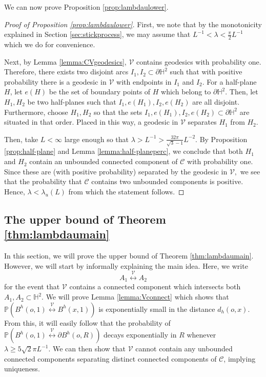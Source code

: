 \documentclass[a4paper,12pt]{article}
\newcommand{\BH}{{\mathbb{H}}}
\newcommand{\BP}{{\mathbb{P}}}
\newcommand{\CC}{{\mathcal{C}}}
\newcommand{\CV}{{\mathcal{V}}}
\begin{document}
We can now prove Proposition \ref{prop:lambdaulower}.
\begin{proof}[Proof of Proposition \ref{prop:lambdaulower}]
First, we note that by the monotonicity explained in Section \ref{sec:stickprocess},
we may assume that $L^{-1}< \lambda<\frac{\pi}{2}L^{-1}$ which we do for convenience.

Next, by Lemma \ref{lemma:CVgeodesics}, $\CV$ contains geodesics with probability one. Therefore, 
there exists two disjoint arcs $I_1,I_2\subset \partial \BH^2$ such that 
with positive probability there is a geodesic in $\CV$ with endpoints in $I_1$ 
and $I_2.$ For a half-plane $H$, let $e(H)$ be the set of boundary points of $H$ which 
belong to $\partial \BH^2.$ Then, let $H_1,H_2$ be two half-planes such that 
$I_1,e(H_1),I_2,e(H_2)$ are all disjoint. Furthermore, choose $H_1,H_2$ so that 
the sets $I_1,e(H_1),I_2,e(H_2) \subset \partial \BH^2$ are situated in that order. 
Placed in this way, a geodesic in $\CV$ separates $H_1$ from $H_2.$

Then, take $L<\infty$
large enough so that $\lambda>L^{-1}>\frac{32\pi}{\sqrt{3}-1}L^{-2}.$ By 
Proposition \ref{prop:half-plane} and Lemma 
\ref{lemma:half-planeperc}, we conclude that both 
$H_1$ and $H_2$ contain an unbounded connected component of $\CC$ with 
probability one. Since these are (with positive probability) separated by the 
geodesic in $\CV,$ we see that the probability
that $\CC$ contains two unbounded components is positive. Hence, $\lambda<\lambda_u(L)$
from which the statement follows.
\end{proof}





\subsection{The upper bound of Theorem \ref{thm:lambdaumain}} 
In this section, we will prove the upper bound of Theorem \ref{thm:lambdaumain}. However, we will 
start by informally explaining the main idea. Here, we write 
\[
A_1 \stackrel{\CV}{\longleftrightarrow} A_2
\]
for the event that $\CV$ 
contains a connected component which intersects both $A_1,A_2\subset \BH^2.$ 
We will prove Lemma \ref{lemma:Vconnect} which shows that
$\BP(B^h(o,1) \stackrel{\CV}{\longleftrightarrow} B^h(x,1))$ is exponentially 
small in the distance $d_h(o,x).$ From this, it will easily follow that the probability of 
$\BP(B^h(o,1) \stackrel{\CV}{\longleftrightarrow} \partial B^h(o,R))$ decays exponentially in $R$
whenever $\lambda \geq 5 \sqrt{2} \pi L^{-1}$. 
We can then show that $\CV$ cannot contain any unbounded connected components separating distinct
connected components of $\CC$, implying uniqueness.
\end{document}
